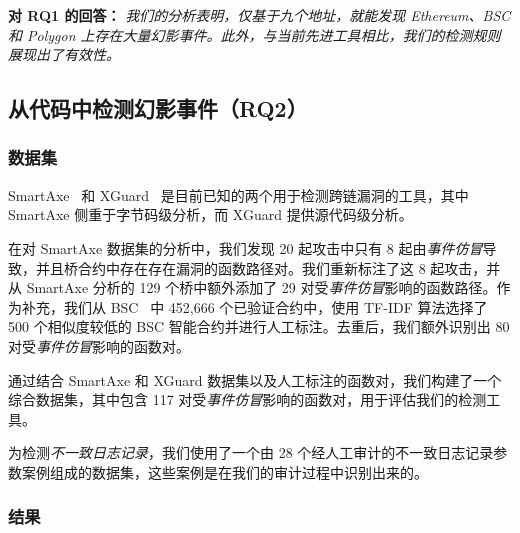 \vspace{\baselineskip}
\begin{mdframed}
\noindent\textbf{对 RQ1 的回答：} \textit{我们的分析表明，仅基于九个地址，就能发现 Ethereum、BSC 和 Polygon 上存在大量幻影事件。此外，与当前先进工具相比，我们的检测规则展现出了有效性。}
\end{mdframed}

\subsection{从代码中检测幻影事件（RQ2）}

\subsubsection{数据集}
SmartAxe~\cite{liao2024smartaxe} 和 XGuard~\cite{wang2024xguard} 是目前已知的两个用于检测跨链漏洞的工具，其中 SmartAxe 侧重于字节码级分析，而 XGuard 提供源代码级分析。

在对 SmartAxe 数据集的分析中，我们发现 20 起攻击中只有 8 起由\emph{事件仿冒}导致，并且桥合约中存在存在漏洞的函数路径对。我们重新标注了这 8 起攻击，并从 SmartAxe 分析的 129 个桥中额外添加了 29 对受\emph{事件仿冒}影响的函数路径。作为补充，我们从 BSC~\cite{bscdata} 中 452,666 个已验证合约中，使用 TF-IDF 算法选择了 500 个相似度较低的 BSC 智能合约并进行人工标注。去重后，我们额外识别出 80 对受\emph{事件仿冒}影响的函数对。

通过结合 SmartAxe 和 XGuard 数据集以及人工标注的函数对，我们构建了一个综合数据集，其中包含 117 对受\emph{事件仿冒}影响的函数对，用于评估我们的检测工具。

为检测\emph{不一致日志记录}，我们使用了一个由 28 个经人工审计的不一致日志记录参数案例组成的数据集，这些案例是在我们的审计过程中识别出来的。

\subsubsection{结果}

